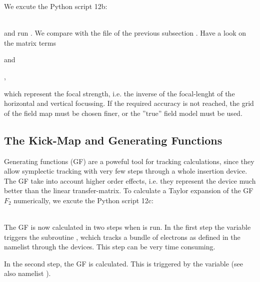 We excute the Python script 12b:

\\

and run \W. We compare  with the file of the previous
subsection . Have a look on the matrix terms


and

,

which represent the focal strength, i.e. the inverse of the
focal-lenght of the horizontal and vertical focussing. If the required
accuracy is not reached, the grid of the field map must be chosen
finer, or the ''true'' field model must be used.

\subsection{The Kick-Map and Generating Functions} \label{ex12c}

Generating functions (GF) are a poweful tool for tracking calculations,
since they allow symplectic tracking with very few steps through a
whole insertion device. The GF take into account higher order effects,
i.e. they represent the device much better than the linear
transfer-matrix. To calculate a Taylor expansion of the GF $F_2$
numerically, we excute the Python script 12c:

\\

The GF is now calculated in two steps when \W is run. In the first step
the variable  triggers the subroutine , wchich
tracks a bundle of electrons as defined in the namelist 
through the devices. This step can be very time consuming.

In the second step, the GF is calculated. This is triggered by the
variable  (see also namelist ).

